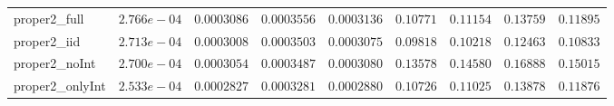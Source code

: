 \begin{table}
\begin{tabular}{lcccccccc}
proper2_full  & $2.766e-04$ & $0.0003086$ & $0.0003556$ & $0.0003136$ & $0.10771$ & $0.11154$ & $0.13759$ & $0.11895$ \\
proper2_iid  & $2.713e-04$ & $0.0003008$ & $0.0003503$ & $0.0003075$ & $0.09818$ & $0.10218$ & $0.12463$ & $0.10833$ \\
proper2_noInt  & $2.700e-04$ & $0.0003054$ & $0.0003487$ & $0.0003080$ & $0.13578$ & $0.14580$ & $0.16888$ & $0.15015$ \\
proper2_onlyInt  & $2.533e-04$ & $0.0002827$ & $0.0003281$ & $0.0002880$ & $0.10726$ & $0.11025$ & $0.13878$ & $0.11876$ \\
\hline 
\end{tabular}


\end{table}